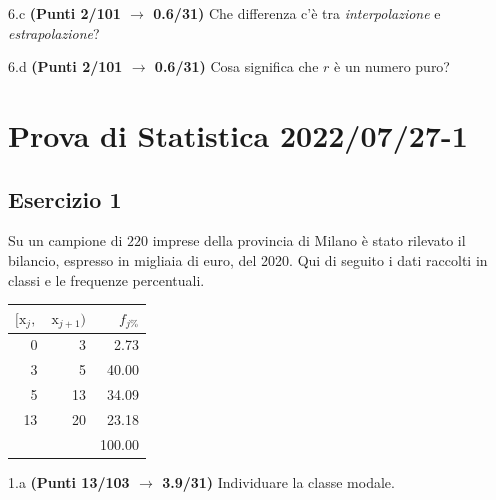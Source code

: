 \documentclass[
  11pt,
]{book}
\theoremstyle{mytheoremstyle}
\theoremstyle{mydefstyle}
\newenvironment{sol}
  {
  \begin{tcolorbox}[enhanced,breakable,arc=0.1mm,boxrule=1pt,colback=white,colframe=iblue,
  title=\bf \fontfamily{lmss}\selectfont \hspace{.5 cm} Soluzione,drop fuzzy shadow]

}{
\end{tcolorbox}
  }
\begin{document}
6.c \textbf{(Punti 2/101 \(\rightarrow\) 0.6/31)} Che differenza c'è tra \emph{interpolazione} e \emph{estrapolazione}?

6.d \textbf{(Punti 2/101 \(\rightarrow\) 0.6/31)} Cosa significa che \(r\) è un numero puro?

\section{Prova di Statistica 2022/07/27-1}\label{prova-di-statistica-20220727-1}

\subsection{Esercizio 1}\label{esercizio-1-16}

Su un campione di \(220\) imprese della provincia di Milano è stato
rilevato il bilancio, espresso in migliaia di euro, del 2020. Qui di seguito i dati raccolti in classi
e le frequenze percentuali.

\begin{sol}

\begin{table}[H]
\centering
\begin{tabular}{rrr}
\toprule
$[\text{x}_j,$ & $\text{x}_{j+1})$ & $f_{j\%}$\\
\midrule
0 & 3 & 2.73\\
3 & 5 & 40.00\\
5 & 13 & 34.09\\
13 & 20 & 23.18\\
 &  & 100.00\\
\bottomrule
\end{tabular}
\end{table}

\end{sol}

1.a \textbf{(Punti 13/103 \(\rightarrow\) 3.9/31)} Individuare la classe modale.
\end{document}
